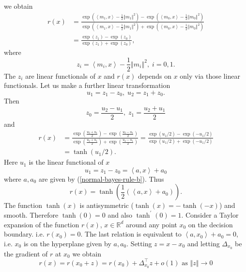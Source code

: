 \documentclass[11pt,twoside]{article}%
\theoremstyle{change}
\begin{document}
we obtain
\begin{align*}
r(x)  & =\frac{\exp\left(  \left\langle m_{1},x\right\rangle -\frac{1}%
{2}\left\Vert m_{1}\right\Vert ^{2}\right)  -\exp\left(  \left\langle
m_{0},x\right\rangle -\frac{1}{2}\left\Vert m_{0}\right\Vert ^{2}\right)
}{\exp\left(  \left\langle m_{1},x\right\rangle -\frac{1}{2}\left\Vert
m_{1}\right\Vert ^{2}\right)  +\exp\left(  \left\langle m_{0},x\right\rangle
-\frac{1}{2}\left\Vert m_{0}\right\Vert ^{2}\right)  }\\
& =\frac{\exp\left(  z_{1}\right)  -\exp\left(  z_{0}\right)  }{\exp\left(
z_{1}\right)  +\exp\left(  z_{0}\right)  },
\end{align*}
where
\[
z_{i}=\left\langle m_{i},x\right\rangle -\frac{1}{2}\left\Vert m_{i}%
\right\Vert ^{2},\;i=0,1.
\]
The $z_{i}$ are linear functionals of $x$ and $r(x)$ depends on $x$ only via
those linear functionals. Let us make a further linear transformation
\[
u_{1}=z_{1}-z_{0},\;u_{2}=z_{1}+z_{0}.
\]
Then
\[
z_{0}=\frac{u_{2}-u_{1}}{2},\;z_{1}=\frac{u_{2}+u_{1}}{2}%
\]
and
\begin{align*}
r(x)  & =\frac{\exp\left(  \frac{u_{2}+u_{1}}{2}\right)  -\exp\left(
\frac{u_{2}-u_{1}}{2}\right)  }{\exp\left(  \frac{u_{2}+u_{1}}{2}\right)
+\exp\left(  \frac{u_{2}-u_{1}}{2}\right)  }=\frac{\exp\left(  u_{1}/2\right)
-\exp\left(  -u_{1}/2\right)  }{\exp\left(  u_{1}/2\right)  +\exp\left(
-u_{1}/2\right)  }\\
& =\tanh\left(  u_{1}/2\right)  .
\end{align*}
Here $u_{1}$ is the linear functional of $x$
\[
u_{1}=z_{1}-z_{0}=\left\langle a,x\right\rangle +a_{0}%
\]
where $a,a_{0}$ are given by (\ref{normal-bayes-rule-b}). Thus
\begin{equation}
r(x)=\tanh\left(  \frac{1}{2}\left(  \left\langle a,x\right\rangle
+a_{0}\right)  \right)  .\label{reg-func-normal}%
\end{equation}
The function $\tanh(x)$ is antisymmetric ($\tanh(x)=-\tanh(-x)$) and smooth.
Therefore $\tanh(0)=0$ and also $\tanh^{\prime}(0)=1$. Consider a Taylor
expansion of the function $r(x)$, $x\in\mathbb{R}^{d}$ around any point
$x_{0}$ on the decision boundary. i.e. $r(x_{0})=0.$ The last relation is
equivalent to $\left\langle a,x_{0}\right\rangle +a_{0}=0$, i.e. $x_{0}$ is on
the hyperplane given by $a,a_{0}$. Setting $z=x-x_{0}$ and letting
$\Delta_{x_{0}}$ be the gradient of $r$ at $x_{0}$ we obtain
\begin{equation}
r(x)=r(x_{0}+z)=r(x_{0})+\Delta_{x_{0}}^{\top}z+o(1)\text{ as }\left\Vert
z\right\Vert \rightarrow0\label{taylor-expan-reg-func}%
\end{equation}
\end{document}
